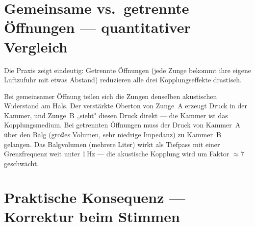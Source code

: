 \documentclass[11pt,a4paper]{article}
\begin{document}
\section{Gemeinsame vs.\ getrennte Öffnungen --- quantitativer Vergleich}

Die Praxis zeigt eindeutig: Getrennte Öffnungen (jede Zunge bekommt ihre eigene Luftzufuhr mit etwas Abstand) reduzieren alle drei Kopplungseffekte drastisch.

Bei gemeinsamer Öffnung teilen sich die Zungen denselben akustischen Widerstand am Hals. Der verstärkte Oberton von Zunge~A erzeugt Druck in der Kammer, und Zunge~B „sieht" diesen Druck direkt --- die Kammer ist das Kopplungsmedium. Bei getrennten Öffnungen muss der Druck von Kammer~A über den Balg (großes Volumen, sehr niedrige Impedanz) zu Kammer~B gelangen. Das Balgvolumen (mehrere Liter) wirkt als Tiefpass mit einer Grenzfrequenz weit unter 1\,Hz --- die akustische Kopplung wird um Faktor $\approx 7$ geschwächt.

\begin{table}[H]
\centering\small
\caption{Empirische Vergleichswerte gemeinsame vs.\ getrennte Öffnungen (volle Spiellautstärke)}
\end{table}

\section{Praktische Konsequenz --- Korrektur beim Stimmen}
\end{document}
